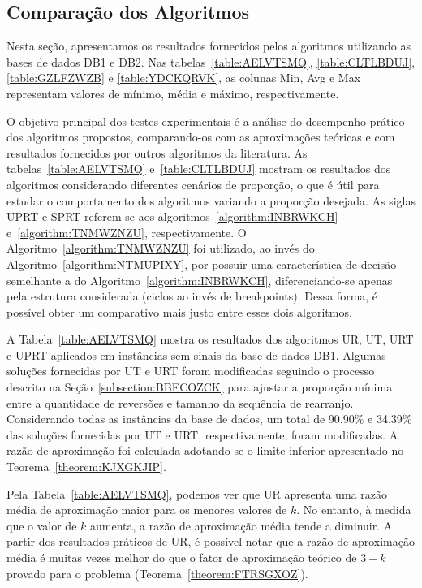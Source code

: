 \subsection{Comparação dos Algoritmos}

Nesta seção, apresentamos os resultados fornecidos pelos algoritmos utilizando as bases de dados DB1 e DB2. Nas tabelas~\ref{table:AELVTSMQ}, \ref{table:CLTLBDUJ}, \ref{table:GZLFZWZB} e \ref{table:YDCKQRVK}, as colunas Min, Avg e Max representam valores de mínimo, média e máximo, respectivamente.

O objetivo principal dos testes experimentais é a análise do desempenho prático dos algoritmos propostos, comparando-os com as aproximações teóricas e com resultados fornecidos por outros algoritmos da literatura. As tabelas~\ref{table:AELVTSMQ} e~\ref{table:CLTLBDUJ} mostram os resultados dos algoritmos considerando diferentes cenários de proporção, o que é útil para estudar o comportamento dos algoritmos variando a proporção desejada. As siglas UPRT e SPRT referem-se aos algoritmos~\ref{algorithm:INBRWKCH} e~\ref{algorithm:TNMWZNZU}, respectivamente. O Algoritmo~\ref{algorithm:TNMWZNZU} foi utilizado, ao invés do Algoritmo~\ref{algorithm:NTMUPIXY}, por possuir uma característica de decisão semelhante a do Algoritmo~\ref{algorithm:INBRWKCH}, diferenciando-se apenas pela estrutura considerada (ciclos ao invés de breakpoints). Dessa forma, é possível obter um comparativo mais justo entre esses dois algoritmos. 

A Tabela~\ref{table:AELVTSMQ} mostra os resultados dos algoritmos UR, UT, URT e UPRT aplicados em instâncias sem sinais da base de dados DB1. Algumas soluções fornecidas por UT e URT foram modificadas seguindo o processo descrito na Seção~\ref{subsection:BBECOZCK} para ajustar a proporção mínima entre a quantidade de reversões e tamanho da sequência de rearranjo. Considerando todas as instâncias da base de dados, um total de 90.90\% e 34.39\% das soluções fornecidas por UT e URT, respectivamente, foram modificadas. A razão de aproximação foi calculada adotando-se o limite inferior apresentado no Teorema~\ref{theorem:KJXGKJIP}.



Pela Tabela~\ref{table:AELVTSMQ}, podemos ver que UR apresenta uma razão média de aproximação maior para os menores valores de $k$. No entanto, à medida que o valor de $k$ aumenta, a razão de aproximação média tende a diminuir. A partir dos resultados práticos de UR, é possível notar que a razão de aproximação média é muitas vezes melhor do que o fator de aproximação teórico de $3-k$ provado para o problema (Teorema~\ref{theorem:FTRSGXOZ}).

